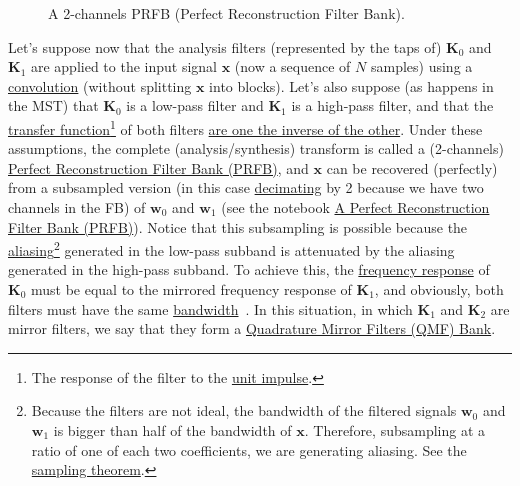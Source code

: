 \begin{figure}
  \centering
  \caption{A 2-channels PRFB (Perfect Reconstruction Filter Bank).}
  \label{fig:PRFB}
\end{figure}

Let's suppose now that the analysis filters (represented by the taps
of) ${\mathbf K}_0$ and ${\mathbf K}_1$ are applied to the input
signal ${\mathbf x}$ (now a sequence of $N$ samples) using a
\href{https://en.wikipedia.org/wiki/Kernel_(image_processing)}{convolution}
(without splitting $\mathbf{x}$ into blocks). Let's also suppose (as
happens in the MST) that ${\mathbf K}_0$ is a low-pass filter and
${\mathbf K}_1$ is a high-pass filter, and that the
\href{https://en.wikipedia.org/wiki/Filter_(signal_processing)#The_transfer_function}{transfer
  function}\footnote{The response of the filter to the
  \href{https://en.wikipedia.org/?title=Unit_impulse&redirect=no}{unit
    impulse}.} of both filters
\href{https://en.wikipedia.org/wiki/Filter_bank#Perfect_reconstruction_filter_banks}{are
  one the inverse of the other}. Under these assumptions, the complete
(analysis/synthesis) transform is called a (2-channels)
\href{https://en.wikipedia.org/wiki/Filter_bank#Perfect_reconstruction_filter_banks}{Perfect
  Reconstruction Filter Bank (PRFB)}, and ${\mathbf x}$ can be
recovered (perfectly) from a subsampled version (in this case
\href{https://en.wikipedia.org/wiki/Downsampling_(signal_processing)}{decimating}
by 2 because we have two channels in the FB) of ${\mathbf w}_0$ and
${\mathbf w}_1$ (see the notebook
\href{https://github.com/Tecnologias-multimedia/intercom/blob/master/docs/PRFB.ipynb}{A
  Perfect Reconstruction Filter Bank (PRFB)}). Notice that this
subsampling is possible because the
\href{https://en.wikipedia.org/wiki/Aliasing}{aliasing}\footnote{Because
  the filters are not ideal, the bandwidth of the filtered signals
  ${\mathbf w}_0$ and ${\mathbf w}_1$ is bigger than half of the
  bandwidth of ${\mathbf x}$. Therefore, subsampling at a ratio of one
  of each two coefficients, we are generating aliasing. See the
  \href{https://en.wikipedia.org/wiki/Nyquist-Shannon_sampling_theorem}{sampling
    theorem}.}  generated in the low-pass subband is attenuated by the
aliasing generated in the high-pass subband. To achieve this, the
\href{https://en.wikipedia.org/wiki/Filter_(signal_processing)#The_transfer_function}{frequency
  response} of ${\mathbf K}_0$ must be equal to the mirrored frequency
response of ${\mathbf K}_1$, and obviously, both filters must have the
same
\href{https://en.wikipedia.org/wiki/Bandwidth_(signal_processing)}{bandwidth}~\cite{sayood2017introduction}. In
this situation, in which ${\mathbf K}_1$ and ${\mathbf K}_2$ are
mirror filters, we say that they form a
\href{https://en.wikipedia.org/wiki/Quadrature_mirror_filter}{Quadrature
  Mirror Filters (QMF) Bank}.

